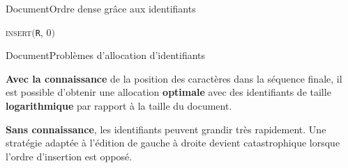 \begin{frame}{Document}{Ordre dense grâce aux identifiants}

  \begin{center}
  \textsc{insert}$($\texttt{R}, $0)$   \\
  \end{center}

  \vspace{1cm}

  \begin{center}
    
  \end{center}

\end{frame}


\begin{frame}{Document}{Problèmes d'allocation d'identifiants}

  \textbf{Avec la connaissance} de la position des caractères dans la séquence
  finale, il est possible d'obtenir une allocation \textbf{optimale} avec des
  identifiants de taille \textbf{logarithmique} par rapport à la taille du document.

  \vspace{0.1cm}

  \begin{center}
  
  \end{center}

  \vspace{0.25cm}

  \textbf{Sans connaissance}, les identifiants peuvent grandir très
  rapidement. Une stratégie adaptée à l'édition de gauche à droite devient
  catastrophique lorsque l'ordre d'insertion est opposé.
  
  \vspace{0.1cm}

  \begin{center}
    
  \end{center}

\end{frame}



